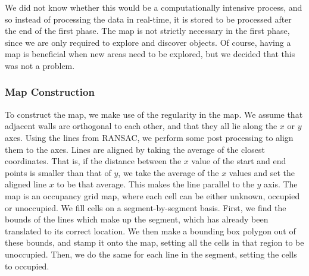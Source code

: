 \documentclass[10pt,a4paper,twocolumn]{article}
\begin{document}
We did not know whether this would be a computationally intensive process, and
so instead of processing the data in real-time, it is stored to be processed
after the end of the first phase. The map is not strictly necessary in the first
phase, since we are only required to explore and discover objects. Of course,
having a map is beneficial when new areas need to be explored, but we decided
that this was not a problem.

\subsubsection{Map Construction}
To construct the map, we make use of the regularity in the map. We assume that
adjacent walls are orthogonal to each other, and that they all lie along the $x$
or $y$ axes. Using the lines from RANSAC, we perform some post processing to
align them to the axes. Lines are aligned by taking the average of the closest
coordinates. That is, if the distance between the $x$ value of the start and end
points is smaller than that of $y$, we take the average of the $x$ values and
set the aligned line $x$ to be that average. This makes the line parallel to the
$y$ axis. The map is an occupancy grid map, where each cell can be either
unknown, occupied or unoccupied. We fill cells on a segment-by-segment basis.
First, we find the bounds of the lines which make up the segment, which has
already been translated to its correct location. We then make a bounding box
polygon out of these bounds, and stamp it onto the map, setting all the cells in
that region to be unoccupied. Then, we do the same for each line in the segment,
setting the cells to occupied.
\end{document}

